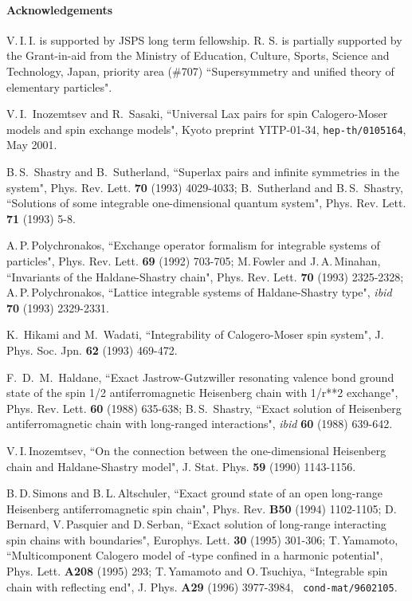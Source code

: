 \documentclass[a4paper,12pt]{article}
\begin{document}
\paragraph{Acknowledgements}
V.\,I.\,I. is supported by JSPS long term fellowship.
R. S. is partially
supported  by the Grant-in-aid from the Ministry of Education, Culture,
Sports, Science and Technology, Japan,  priority area (\#707)
``Supersymmetry and unified theory of elementary particles".
\begin{thebibliography}{99}
V.\,I.\, Inozemtsev and R.\, Sasaki,
``Universal Lax pairs for spin Calogero-Moser models and spin
exchange models", Kyoto preprint YITP-01-34, {\tt hep-th/0105164}, May 2001.


B.\,S.\, Shastry and B.\, Sutherland, ``Superlax pairs and infinite
symmetries
in the \coordHE{} system", Phys. Rev. Lett. {\bf 70} (1993) 4029-4033;
B.\, Sutherland and B.\,S.\, Shastry, ``Solutions of some integrable
one-dimensional quantum system",
Phys. Rev. Lett. {\bf 71} (1993) 5-8.

A.\,P.\,Polychronakos, ``Exchange operator formalism for integrable systems
of
particles", Phys. Rev. Lett. {\bf 69} (1992) 703-705;
M.\,Fowler and J.\,A.\,Minahan, ``Invariants of the Haldane-Shastry \coordHE{}
chain", Phys. Rev. Lett. {\bf 70} (1993) 2325-2328;
A.\,P.\,Polychronakos,
``Lattice integrable systems of Haldane-Shastry type",
{\it ibid} {\bf 70} (1993)
2329-2331.



K.\, Hikami and   M.\, Wadati,  ``Integrability of Calogero-Moser
spin system", J. Phys. Soc. Jpn.
 {\bf 62} (1993) 469-472.

F.\, D.\, M.\,  Haldane, ``Exact Jastrow-Gutzwiller resonating
    valence bond ground state of the spin 1/2 antiferromagnetic
    Heisenberg chain with 1/r**2 exchange",
Phys. Rev. Lett. {\bf 60} (1988) 635-638; B.\,S.\,
Shastry, ``Exact solution of \coordHE{} Heisenberg antiferromagnetic chain
with long-ranged interactions", {\it ibid} {\bf 60} (1988) 639-642.


V.\,I.\,Inozemtsev, ``On the connection between the one-dimensional
\coordHE{} Heisenberg chain and Haldane-Shastry model",
J. Stat. Phys. {\bf 59} (1990) 1143-1156.




B.\,D.\,Simons and B.\,L.\,Altschuler,
``Exact ground state of an open \coordHE{} long-range Heisenberg
antiferromagnetic spin chain",
Phys. Rev. {\bf B50} (1994) 1102-1105;
D.\,Bernard, V.\,Pasquier and D.\,Serban, ``Exact solution of
 long-range interacting spin chains with boundaries",
Europhys. Lett. {\bf 30} (1995) 301-306;
T.\,Yamamoto, ``Multicomponent Calogero model of \coordHE{}-type confined in
a harmonic potential", Phys. Lett. {\bf A208} (1995) 293;
T.\,Yamamoto and O.\,Tsuchiya, ``Integrable \coordHE{} spin chain with
reflecting end", J. Phys. {\bf A29} (1996) 3977-3984, {\tt
cond-mat/9602105}.


\end{thebibliography}
\end{document}
